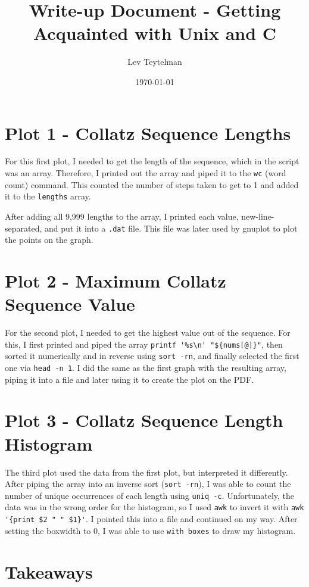 \documentclass[12pt]{article}
\title{Write-up Document - Getting Acquainted with Unix and C}
\author{Lev Teytelman}
\date{\today}
\begin{document}
\maketitle
\section*{Plot 1 - Collatz Sequence Lengths}

For this first plot, I needed to get the length of the sequence, which in the script was an array. Therefore, I printed out the array and piped it to the \verb|wc| (word count) command. This counted the number of steps taken to get to 1 and added it to the \verb|lengths| array.

After adding all 9,999 lengths to the array, I printed each value, new-line-separated, and put it into a \verb|.dat| file. This file was later used by gnuplot to plot the points on the graph.
\section*{Plot 2 - Maximum Collatz Sequence Value}

For the second plot, I needed to get the highest value out of the sequence. For this, I first printed and piped the array \verb|printf '%s\n' "${nums[@]}"|, then sorted it numerically and in reverse using \verb|sort -rn|, and finally selected the first one via \verb|head -n 1|. I did the same as the first graph with the resulting array, piping it into a file and later using it to create the plot on the PDF.
\section*{Plot 3 - Collatz Sequence Length Histogram}

The third plot used the data from the first plot, but interpreted it differently. After piping the array into an inverse sort (\verb|sort -rn|), I was able to count the number of unique occurrences of each length using \verb|uniq -c|. Unfortunately, the data was in the wrong order for the histogram, so I used \verb|awk| to invert it with \verb|awk '{print $2 " " $1}'|. I pointed this into a file and continued on my way. After setting the boxwidth to 0, I was able to use \verb|with boxes| to draw my histogram.
\section*{Takeaways}
\end{document}
